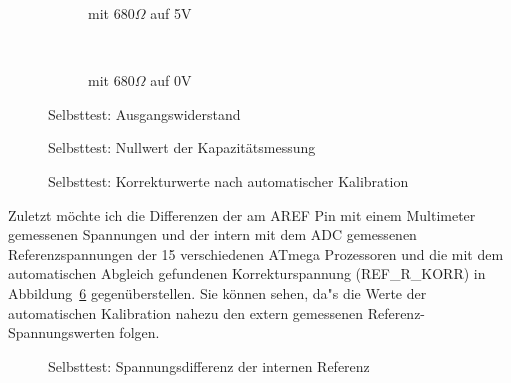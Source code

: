 \begin{figure}[H]
  \begin{subfigure}[b]{9cm}
  \centering
    \resizebox{9cm}{!}{}
    \caption{mit \(680 \Omega\) auf 5V}
    \label{fig:SelfTRoL}
  \end{subfigure}
  ~
  \begin{subfigure}[b]{9cm}
  \centering
    \resizebox{9cm}{!}{}
    \caption{mit \(680 \Omega\) auf 0V}
    \label{fig:SelfTRoH}
  \end{subfigure}
  \caption{Selbsttest: Ausgangswiderstand}
\end{figure}

\begin{figure}[H]
  \centering
  \resizebox{9cm}{!}{}
  \caption{Selbsttest: Nullwert der Kapazit\"atsmessung}
  \label{fig:SelfTcap}
\end{figure}

\begin{figure}[H]
  \centering
  \resizebox{9cm}{!}{}
  \caption{Selbsttest: Korrekturwerte nach automatischer Kalibration}
  \label{fig:SelfTrefKorr}
\end{figure}

Zuletzt m\"ochte ich die Differenzen der am AREF Pin mit einem Multimeter
gemessenen Spannungen und der intern mit dem ADC gemessenen Referenzspannungen der
15 verschiedenen ATmega Prozessoren und die mit dem automatischen Abgleich
gefundenen Korrekturspannung (REF\_R\_KORR) in Abbildung~\ref{fig:SelfTrefDiff} gegen\"uberstellen.
Sie k\"onnen sehen, da"s die Werte der automatischen Kalibration nahezu den extern
gemessenen Referenz-Spannungswerten folgen.

\begin{figure}[H]
  \centering
  \resizebox{9cm}{!}{}
  \caption{Selbsttest: Spannungsdifferenz der internen Referenz}
  \label{fig:SelfTrefDiff}
\end{figure}

